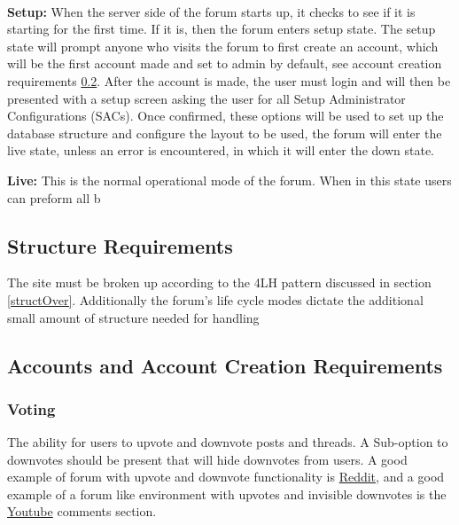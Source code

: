 \documentclass[]{article}
\begin{document}
\paragraph{}
\textbf{Setup:}
When the server side of the forum starts up, it checks to see if it is starting for the first time. If it is, then the forum enters setup state. The setup state will prompt anyone who visits the forum to first create an account, which will be the first account made and set to admin by default, see account creation requirements \ref{accountCreation}. After the account is made, the user must login and will then be presented with a setup screen asking the user for all Setup Administrator Configurations (SACs). Once confirmed, these options will be used to set up the database structure and configure the layout to be used, the forum will enter the live state, unless an error is encountered, in which it will enter the down state.

\textbf{Live:}
This is the normal operational mode of the forum. When in this state users can preform all b

\subsection{Structure Requirements}
The site must be broken up according to the 4LH pattern discussed in section \ref{structOver}. Additionally the forum's life cycle modes dictate the additional small amount of structure needed for handling  



\subsection{Accounts and Account Creation Requirements}\label{accountCreation}

\subsubsection{Voting}
The ability for users to upvote and downvote posts and threads. A Sub-option to downvotes should be present that will hide downvotes from users. 
A good example of forum with upvote and downvote functionality is \href{https://www.reddit.com/}{Reddit}, and a good example of a forum like environment with upvotes and invisible downvotes is the \href{https://www.youtube.com/}{Youtube} comments section. 
\end{document}
